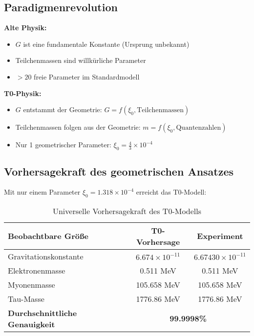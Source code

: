 \documentclass[12pt,a4paper]{article}
\newcommand{\xiconst}{\xi_0 = \frac{4}{3} \times 10^{-4}}
\theoremstyle{definition}
\begin{document}
	\subsection{Paradigmenrevolution}
	
	\textbf{Alte Physik:}
	\begin{itemize}
		\item $G$ ist eine fundamentale Konstante (Ursprung unbekannt)
		\item Teilchenmassen sind willkürliche Parameter
		\item $>20$ freie Parameter im Standardmodell
	\end{itemize}
	
	\textbf{T0-Physik:}
	\begin{itemize}
		\item $G$ entstammt der Geometrie: $G = f(\xi_0, \text{Teilchenmassen})$
		\item Teilchenmassen folgen aus der Geometrie: $m = f(\xi_0, \text{Quantenzahlen})$
		\item Nur 1 geometrischer Parameter: $\xiconst$
	\end{itemize}
	
	\subsection{Vorhersagekraft des geometrischen Ansatzes}
	
	Mit nur einem Parameter $\xi_0 = 1.318 \times 10^{-4}$ erreicht das T0-Modell:
	
	\begin{table}[h]
		\centering
		\begin{tabular}{@{}lcc@{}}
			\toprule
			\textbf{Beobachtbare Größe} & \textbf{T0-Vorhersage} & \textbf{Experiment} \\
			\midrule
			Gravitationskonstante & $6.674 \times 10^{-11}$ & $6.67430 \times 10^{-11}$ \\
			Elektronenmasse & 0.511 MeV & 0.511 MeV \\
			Myonenmasse & 105.658 MeV & 105.658 MeV \\
			Tau-Masse & 1776.86 MeV & 1776.86 MeV \\
			\midrule
			\textbf{Durchschnittliche Genauigkeit} & \multicolumn{2}{c}{\textbf{99.9998\%}} \\
			\bottomrule
		\end{tabular}
		\caption{Universelle Vorhersagekraft des T0-Modells}
	\end{table}
	
\end{document}
